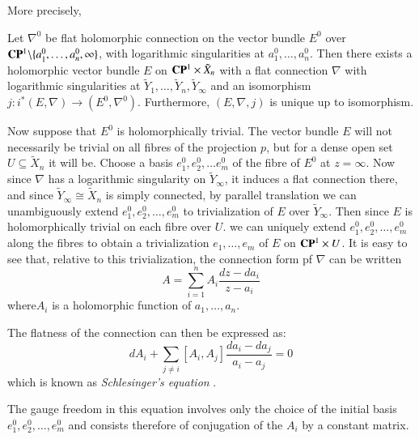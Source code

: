  More precisely,

\begin{thm}\label{art7-thm-1}
 Let $\nabla^{0}$ be flat holomorphic connection on the vector bundle $E^{0}$ over $\mathbf{C}\mathbf{P}^{1}\backslash \{ a_{1}^{0}, \ldots, a_{n}^{0}, \infty\}$, with logarithmic singularities at $a_{1}^{0}, \ldots, a_{n}^{0}$. Then there exists a holomorphic vector bundle $E$ on $\mathbf{C} \mathbf{P}^{1} \times \tilde{X}_{n}$ with a flat connection $\nabla$ with logarithmic singularities at $\tilde{Y}_{1}, \ldots,\tilde{Y}_{n}, \tilde{Y}_{\infty}$ and an isomorphism $j : i^{*} (E, \nabla) \rightarrow (E^{0}, \nabla^{0})$. Furthermore, $(E, \nabla, j)$ is unique up to isomorphism.
\end{thm}

 Now suppose that $E^{0}$ is holomorphically trivial. The vector bundle $E$ will not necessarily be trivial on all fibres of the projection $p$, but for a dense open set $U \subseteq \tilde{X}_{n}$ it will be. Choose a basis $e_{1}^{0}, e_{2}^{0}, \ldots e_{m}^{0}$ of the fibre of $E^{0}$ at $z = \infty$. Now since $\nabla$ has a logarithmic singularity on $\tilde{Y}_{\infty}$, it induces a flat connection there, and since $\tilde{Y}_{\infty} \cong \tilde{X}_{n}$ is simply connected, by parallel translation we can unambiguously extend $e_{1}^{0}, e_{2}^{0}, \ldots, e_{m}^{0}$ to trivialization of $E$ over $\tilde{Y}_{\infty}$. Then since $E$ is holomorphically trivial on each fibre over $U$. we can uniquely extend $e_{1}^{0}, e_{2}^{0}, \ldots, e_{m}^{0}$ along the fibres to obtain a trivialization $e_{1}, \ldots, e_{m}$ of $E$ on $\mathbf{C}\mathbf{P}^{1} \times U$. It is easy to see that, relative to this trivialization, the connection form pf $\nabla$ can be written
\begin{equation*}\label{art7-eq-2}
A = \sum\limits_{i=1}^{n}A_{i} \dfrac{dz-da_{i}}{z-a_{i}}\tag{2}
\end{equation*}
where\pageoriginale $A_{i}$ is a holomorphic function of $a_{1}, \ldots, a_{n}$.

The flatness of the connection can then be expressed as:
$$
dA_{i} + \sum\limits_{j\neq i}[A_{i}, A_{j}]\dfrac{da_{i}-da_{j}}{a_{i}-a_{j}} =0
$$
which is known as \textit{Schlesinger's equation} \cite{art7-key15}.

The gauge freedom in this equation involves only the choice of the initial basis $e_{1}^{0}, e_{2}^{0}, \ldots, e_{m}^{0}$ and consists therefore of conjugation of the $A_{i}$ by a constant matrix.

